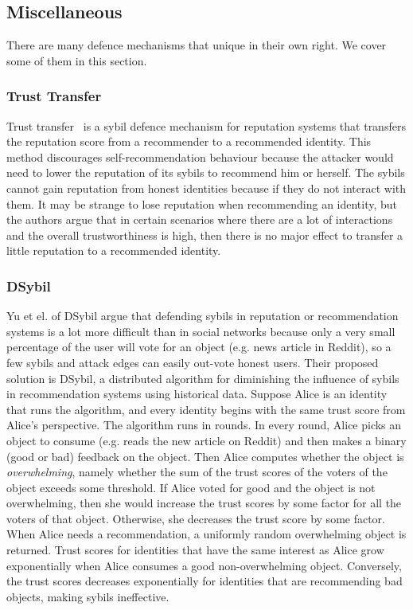 
\subsection{Miscellaneous}
There are many defence mechanisms that unique in their own right. We cover some
of them in this section.

\subsubsection{Trust Transfer}
Trust transfer~\cite{seigneur2005trust} is a sybil defence mechanism for
reputation systems that transfers the reputation score from a recommender to a
recommended identity. This method discourages self-recommendation behaviour
because the attacker would need to lower the reputation of its sybils to
recommend him or herself. The sybils cannot gain reputation from honest
identities because if they do not interact with them. It may be strange to lose
reputation when recommending an identity, but the authors argue that in certain
scenarios where there are a lot of interactions and the overall trustworthiness
is high, then there is no major effect to transfer a little reputation to
a recommended identity.

\subsubsection{DSybil}
Yu et el. of DSybil\cite{yu2009dsybil} argue that defending sybils in reputation
or recommendation systems is a lot more difficult than in social networks
because only a very small percentage of the user will vote for an object (e.g.
news article in Reddit), so a few sybils and attack edges can easily out-vote
honest users. Their proposed solution is DSybil, a distributed algorithm for
diminishing the influence of sybils in recommendation systems using historical
data. Suppose Alice is an identity that runs the algorithm, and every identity
begins with the same trust score from Alice's perspective. The algorithm runs in
rounds. In every round, Alice picks an object to consume (e.g. reads the new
article on Reddit) and then makes a binary (good or bad) feedback on the object.
Then Alice computes whether the object is \emph{overwhelming}, namely whether
the sum of the trust scores of the voters of the object exceeds some threshold.
If Alice voted for good and the object is not overwhelming, then she would
increase the trust scores by some factor for all the voters of that object.
Otherwise, she decreases the trust score by some factor. When Alice needs a
recommendation, a uniformly random overwhelming object is returned. Trust scores
for identities that have the same interest as Alice grow exponentially when
Alice consumes a good non-overwhelming object. Conversely, the trust scores
decreases exponentially for identities that are recommending bad objects, making
sybils ineffective.


